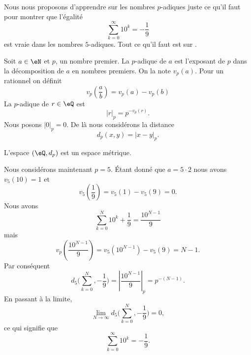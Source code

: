 Nous nous proposons d'apprendre sur les nombres \( p\)-adiques juste ce qu'il faut pour montrer que l'égalité
\begin{equation}
    \sum_{k=0}^{\infty}10^k=-\frac{1}{ 9 }
\end{equation}
est vraie dans les nombres \( 5\)-adiques. Tout ce qu'il faut est sur .

Soit \( a\in \eN\) et \( p\), un nombre premier. La  \( p\)-adique de \( a\) est l'exposant de \( p\) dans la décomposition de \( a\) en nombres premiers. On la note \( v_p(a)\). Pour un rationnel on définit
\begin{equation}
    v_p\left( \frac{ a }{ b } \right)=v_p(a)-v_p(b)
\end{equation}
La  \( p\)-adique de \( r\in \eQ\) est 
\begin{equation}
    | r |_p=p^{-v_p(r)}.
\end{equation}
Nous posons \( | 0 |_p=0\). De là nous considérons la distance
\begin{equation}
    d_p(x,y)=| x-y |_p.
\end{equation}

\begin{lemma}
    L'espace \( (\eQ,d_p)\) est un espace métrique.
\end{lemma}

Nous considérons maintenant \( p=5\). Étant donné que \( a=5\cdot 2\) nous avons \( v_5(10)=1\) et
\begin{equation}
    v_5\left( \frac{1}{ 9 } \right)=v_5(1)-v_5(9)=0.
\end{equation}
Nous avons
\begin{equation}
    \sum_{k=0}^N10^k+\frac{1}{ 9 }=\frac{ 10^{N-1} }{ 9 }
\end{equation}
mais
\begin{equation}
    v_p\left( \frac{ 10^{N-1} }{ 9 } \right)=v_5(10^{N-1})-v_5(9)=N-1.
\end{equation}
Par conséquent
\begin{equation}
    d_5\big( \sum_{k=0}^N,-\frac{1}{ 9 } \big)=| \frac{ 10^{N-1} }{ 9 } |_p=p^{-(N-1)}.
\end{equation}
En passant à la limite,
\begin{equation}
    \lim_{N\to \infty} d_5\big( \sum_{k=0}^N,-\frac{1}{ 9 } \big)=0,
\end{equation}
ce qui signifie que
\begin{equation}
    \sum_{k=0}^{\infty}10^k=-\frac{1}{ 9 }.
\end{equation}
